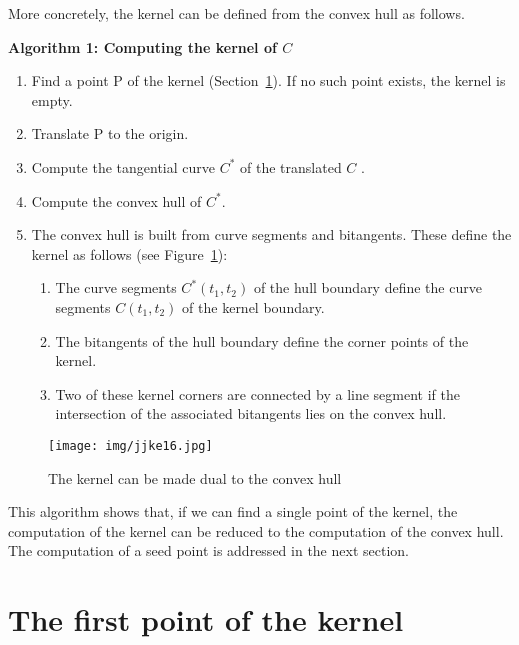 \documentclass{sig-alternate}
\begin{document}
More concretely, the kernel can be defined from the convex hull as follows.

\newpage

\centerline{{\bf Algorithm 1: Computing the kernel of $C$}}

\begin{enumerate}
\item 	Find a point P of the kernel (Section~\ref{sec:first}).  If no such point exists, 
	the kernel is empty.
\item   Translate P to the origin.
\item	Compute the tangential curve $C^*$ of the translated $C$ \cite{jj01}.
\item	Compute the convex hull of $C^*$.
\item	The convex hull is built from curve segments and bitangents.
	These define the kernel as follows (see Figure~\ref{fig:kernelob1a}):
\begin{enumerate}
\item
	The curve segments $C^*(t_1,t_2)$ of the hull boundary define
	the curve segments $C(t_1,t_2)$ of the kernel boundary.
\item
	The bitangents of the hull boundary define the corner points of the kernel.
\item
	Two of these kernel corners are connected by a line segment if the intersection of the
	associated bitangents lies on the convex hull.
\end{enumerate}
\end{enumerate}

\begin{figure}[h]
\begin{center}
\texttt{[image: img/jjke16.jpg]}
\end{center}
\caption{The kernel can be made dual to the convex hull}
\label{fig:kernelob1a}
\end{figure}

This algorithm shows that, if we can find a single point of the kernel,
the computation of the kernel can be reduced to the computation of the convex hull.
The computation of a seed point is addressed in the next section.


\section{The first point of the kernel}
\label{sec:first}
\end{document}
